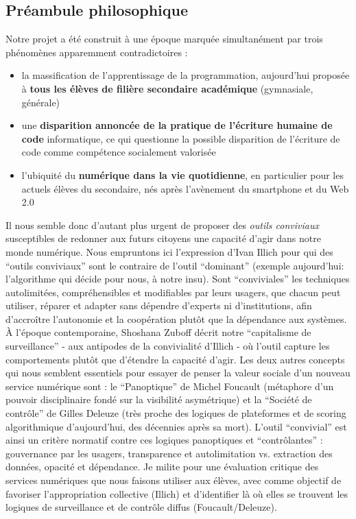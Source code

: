 \documentclass[11pt,a4paper]{article}
\let\cite\parencite
\begin{document}
\subsection{Préambule philosophique}
Notre projet a été construit à une époque marquée simultanément par trois phénomènes apparemment contradictoires : 
\begin{itemize} 
    \item la massification de l'apprentissage de la programmation, aujourd'hui proposée à \textbf{tous les élèves de filière secondaire académique} (gymnasiale, générale) 
    \item une \textbf{disparition annoncée de la pratique de l'écriture humaine de code} informatique, ce qui questionne la possible disparition de l'écriture de code comme compétence socialement valorisée
    \item l'ubiquité du \textbf{numérique dans la vie quotidienne}, en particulier pour les actuels élèves du secondaire, nés après l'avènement du smartphone et du Web 2.0 
\end{itemize}
Il nous semble donc d'autant plus urgent de proposer des \textit{outils conviviaux} susceptibles de redonner aux futurs citoyens une capacité d'agir dans notre monde numérique. Nous empruntons ici l'expression d'Ivan Illich \cite{Illich} pour qui des ``outils conviviaux'' sont le contraire de l'outil ``dominant'' (exemple aujourd'hui: l'algorithme qui décide pour nous, à notre insu). Sont ``conviviales'' les techniques autolimitées, compréhensibles et modifiables par leurs usagers, que chacun peut utiliser, réparer et adapter sans dépendre d'experts ni d'institutions, afin d'accroître l'autonomie et la coopération plutôt que la dépendance aux systèmes.
\`{A} l'époque contemporaine, Shoshana Zuboff décrit notre ``capitalisme de surveillance'' - aux antipodes de la convivialité d'Illich - où l'outil capture les comportements plutôt que d'étendre la capacité d'agir.
Les deux autres concepts qui nous semblent essentiels pour essayer de penser la valeur sociale d'un nouveau service numérique sont : le ``Panoptique'' \cite{Foucault} de Michel Foucault (métaphore d'un pouvoir disciplinaire fondé sur la visibilité asymétrique) et la ``Société de contrôle'' \cite{Deleuze} de Gilles Deleuze (très proche des logiques de plateformes et de scoring algorithmique d'aujourd'hui, des décennies après sa mort).
L'outil ``convivial'' est ainsi un critère normatif contre ces logiques panoptiques et ``contrôlantes'' : gouvernance par les usagers, transparence et autolimitation vs. extraction des données, opacité et dépendance. 
Je milite pour une évaluation critique des services numériques que nous faisons utiliser aux élèves, avec comme objectif de favoriser l'appropriation collective (Illich) et d'identifier là où elles se trouvent les logiques de surveillance et de contrôle diffus (Foucault/Deleuze).
\end{document}
